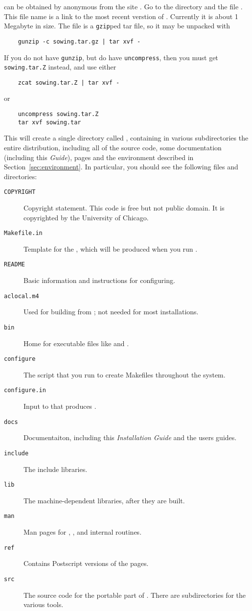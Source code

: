 { can be obtained by anonymous  from the site
.  Go to the directory  and 
the file .  This file name is a link to the most recent
verstion of .  Currently it is about 1 Megabyte in size.  The
file is a {\tt gzip}ped tar file, so it may be unpacked with
\begin{verbatim}
    gunzip -c sowing.tar.gz | tar xvf -
\end{verbatim}
If you do not have {\tt gunzip}, but do have {\tt uncompress}, then you must
get {\tt sowing.tar.Z} instead, and use either 
\begin{verbatim}
    zcat sowing.tar.Z | tar xvf -
\end{verbatim}
or 
\begin{verbatim}
    uncompress sowing.tar.Z
    tar xvf sowing.tar
\end{verbatim}
This will create a single directory called , containing in various
subdirectories the entire distribution, including all of the source code, some
documentation (including this {\em Guide}),  pages and the 
environment described in Section~\ref{sec:environment}.
In particular, you should see the following files and directories:
\begin{description}
\item[{\tt COPYRIGHT}] Copyright statement.  This code is free but not public
  domain.  It is copyrighted by the University of Chicago.
\item[{\tt Makefile.in}] Template for the , which will be
  produced when you   run .
\item[{\tt README}] Basic information and instructions for configuring.
\item[{\tt aclocal.m4}] Used for building  from ;
 not needed for most installations.
\item[{\tt bin}] Home for executable files like  and .
\item[{\tt configure}] The script that you run to create Makefiles throughout the
  system. 
\item[{\tt configure.in}] Input to  that produces .
\item[{\tt docs}] Documentaiton, including this {\em Installation Guide\/} and
  the users guides.
\item[{\tt include}] The include libraries.
\item[{\tt lib}] The machine-dependent libraries, after they are built.
\item[{\tt man}] Man pages for , , and internal routines.
\item[{\tt ref}] Contains Postscript versions of the  pages.
\item[{\tt src}] The source code for the portable part of .
  There are subdirectories for the various tools.
\end{description}

}
